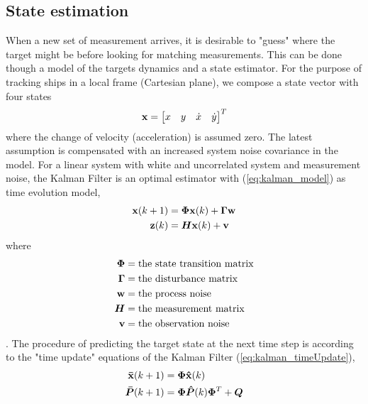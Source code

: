 \subsection{State estimation} %
When a new set of measurement arrives, it is desirable to "guess" where the target might be before looking for matching measurements. This can be done though a model of the targets dynamics and a state estimator. For the purpose of tracking ships in a local frame (Cartesian plane), we compose a state vector with four states
\begin{equation}
\boldsymbol{\mathbf{x}} = \begin{bmatrix}
x & y & \dot{x} & \dot{y}
\end{bmatrix}^T
\label{eq:state_vector}
\end{equation}
where the change of velocity (acceleration) is assumed zero. The latest assumption is compensated with an increased system noise covariance in the model. For a linear system with white and uncorrelated system and measurement noise, the Kalman Filter is an optimal estimator with (\ref{eq:kalman_model}) as time evolution model,
\begin{equation}
\begin{split}
\boldsymbol{\mathbf{x}}(k+1) &= \bm{\Phi} \boldsymbol{\mathbf{x}}(k) + \bm{\Gamma} \boldsymbol{\mathbf{w}} \\
\boldsymbol{\mathbf{z}}(k) &= \bm{H} \boldsymbol{\mathbf{x}}(k) + \boldsymbol{\mathbf{v}}
\end{split}
\label{eq:kalman_model}
\end{equation}
where
\begin{equation}
\begin{split}
\bm{\Phi} 	&= \text{the state transition matrix} \\
\bm{\Gamma}	&= \text{the disturbance matrix} \\
\boldsymbol{\mathbf{w}}		&= \text{the process noise} \\
\bm{H} 		&= \text{the measurement matrix} \\
\boldsymbol{\mathbf{v}} 		&= \text{the observation noise} \\
\end{split}
\end{equation}.
The procedure of predicting the target state at the next time step is according to the "time update" equations of the Kalman Filter (\ref{eq:kalman_timeUpdate}),
\begin{equation}
\begin{split}
\boldsymbol{\mathbf{\bar{x}}}(k+1) 	&= \bm{\Phi} \boldsymbol{\mathbf{\hat{x}}}(k) \\
\bm{\bar{P}}(k+1)	&= \bm{\Phi} \bm{\hat{P}}(k)  \bm{\Phi}^T + \bm{Q} \\
\end{split}
\label{eq:kalman_timeUpdate}
\end{equation}
